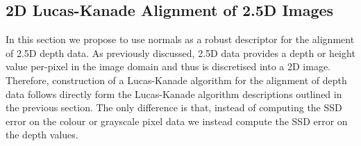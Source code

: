 \subsection{2D Lucas-Kanade Alignment of 2.5D Images}\label{subsec:singl_img_lk_2d}
In this section we propose to use normals as a robust descriptor for the
alignment of 2.5D depth data. As previously discussed, 2.5D data provides a depth
or height value per-pixel in the image domain and thus is discretised into
a 2D image. Therefore, construction of a Lucas-Kanade algorithm for the alignment
of depth data follows directly form the Lucas-Kanade algorithm descriptions
outlined in the previous section. The only difference is that, instead of
computing the SSD error on the colour or grayscale pixel data we instead compute
the SSD error on the depth values.

